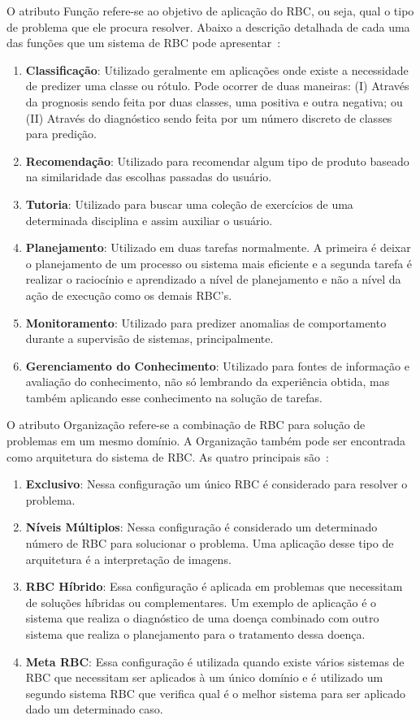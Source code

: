 O atributo Função refere-se ao objetivo de aplicação do RBC, ou seja, qual o tipo de problema que ele procura resolver. Abaixo a descrição detalhada de cada uma das funções que um sistema de RBC pode apresentar~\cite{Lopez:2013}:

\begin{enumerate}
	\item \textbf{Classificação}: Utilizado geralmente em aplicações onde existe a necessidade de predizer uma classe ou rótulo. Pode ocorrer de duas maneiras: (I) Através da prognosis sendo feita por duas classes, uma positiva e outra negativa; ou (II) Através do diagnóstico sendo feita por um número discreto de classes para predição.
	\item \textbf{Recomendação}: Utilizado para recomendar algum tipo de produto baseado na similaridade das escolhas passadas do usuário.
	\item \textbf{Tutoria}: Utilizado para buscar uma coleção de exercícios de uma determinada disciplina e assim auxiliar o usuário.
	\item \textbf{Planejamento}: Utilizado em duas tarefas normalmente.  A primeira é deixar o planejamento de um processo ou sistema mais eficiente e a segunda tarefa é realizar o raciocínio e aprendizado a nível de planejamento e não a nível da ação de execução como os demais RBC's.
	\item \textbf{Monitoramento}: Utilizado para predizer anomalias de comportamento durante a supervisão de sistemas, principalmente.
	\item \textbf{Gerenciamento do Conhecimento}: Utilizado para fontes de informação e avaliação do conhecimento, não só lembrando da experiência obtida, mas também aplicando esse conhecimento na solução de tarefas.
\end{enumerate}

O atributo Organização refere-se a combinação de RBC para solução de problemas em um mesmo domínio. A Organização também pode ser encontrada como arquitetura do sistema de RBC. As quatro principais são~\cite{Lopez:2013}:

\begin{enumerate}
	\item \textbf{Exclusivo}: Nessa configuração um único RBC é considerado para resolver o problema.
	\item \textbf{Níveis Múltiplos}: Nessa configuração é considerado um determinado número de RBC para solucionar o problema. Uma aplicação desse tipo de arquitetura é a interpretação de imagens.
	\item \textbf{RBC Híbrido}: Essa configuração é aplicada em problemas que necessitam de soluções híbridas ou complementares. Um exemplo de aplicação é o sistema que realiza o diagnóstico de uma doença combinado com outro sistema que realiza o planejamento para o tratamento dessa doença.
	\item \textbf{Meta RBC}: Essa configuração é utilizada quando existe vários sistemas de RBC que necessitam ser aplicados à um único domínio e é utilizado um segundo sistema RBC que verifica qual é o melhor sistema para ser aplicado dado um determinado caso.
\end{enumerate}

